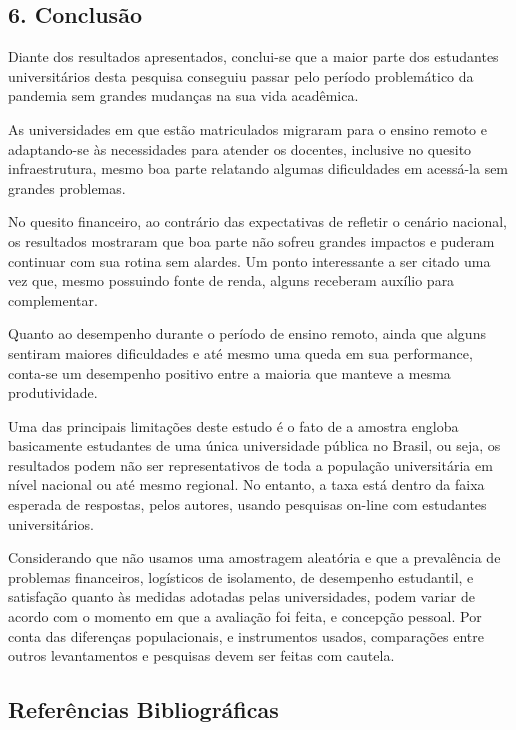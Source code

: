 \documentclass[
]{article}
\begin{document}
\hypertarget{conclusuxe3o}{%
\subsection{6. Conclusão}\label{conclusuxe3o}}

Diante dos resultados apresentados, conclui-se que a maior parte dos
estudantes universitários desta pesquisa conseguiu passar pelo período
problemático da pandemia sem grandes mudanças na sua vida acadêmica.

As universidades em que estão matriculados migraram para o ensino remoto
e adaptando-se às necessidades para atender os docentes, inclusive no
quesito infraestrutura, mesmo boa parte relatando algumas dificuldades
em acessá-la sem grandes problemas.

No quesito financeiro, ao contrário das expectativas de refletir o
cenário nacional, os resultados mostraram que boa parte não sofreu
grandes impactos e puderam continuar com sua rotina sem alardes. Um
ponto interessante a ser citado uma vez que, mesmo possuindo fonte de
renda, alguns receberam auxílio para complementar.

Quanto ao desempenho durante o período de ensino remoto, ainda que
alguns sentiram maiores dificuldades e até mesmo uma queda em sua
performance, conta-se um desempenho positivo entre a maioria que manteve
a mesma produtividade.

Uma das principais limitações deste estudo é o fato de a amostra engloba
basicamente estudantes de uma única universidade pública no Brasil, ou
seja, os resultados podem não ser representativos de toda a população
universitária em nível nacional ou até mesmo regional. No entanto, a
taxa está dentro da faixa esperada de respostas, pelos autores, usando
pesquisas on-line com estudantes universitários.

Considerando que não usamos uma amostragem aleatória e que a prevalência
de problemas financeiros, logísticos de isolamento, de desempenho
estudantil, e satisfação quanto às medidas adotadas pelas universidades,
podem variar de acordo com o momento em que a avaliação foi feita, e
concepção pessoal. Por conta das diferenças populacionais, e
instrumentos usados, comparações entre outros levantamentos e pesquisas
devem ser feitas com cautela.

\hypertarget{referuxeancias-bibliogruxe1ficas}{%
\subsection{Referências
Bibliográficas}\label{referuxeancias-bibliogruxe1ficas}}
\end{document}

